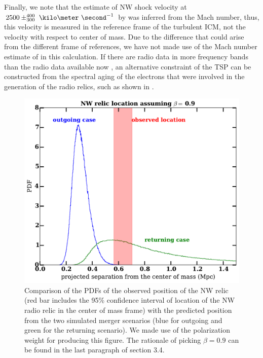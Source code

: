 \documentclass[letterpaper,useAMS,usenatbib]{mn2e}
\begin{document}
\par 
Finally, we note that the estimate of NW shock velocity at $2500
\pm^{400}_{300}~\kilo\meter~\second^{-1}$ by \cite{L13} was inferred from
the Mach number, thus, this velocity is measured in the reference frame of
the turbulent ICM, not the velocity with respect to center of
mass. Due to the difference that could arise from the different frame of
references, we have not made use of the Mach number estimate of \cite{L13} in this
calculation. If there are radio data in more frequency bands than
the radio data available now \citep{L13}, an alternative constraint of the
TSP can be constructed from the spectral aging of the electrons that were involved in the generation of the
radio relics, such as shown in \citet{Stroe14}. \par
\begin{figure}
	\includegraphics[width=\linewidth]{our_guess.pdf}
	\caption{Comparison of the PDFs of the observed position of the NW relic (red bar
		includes the 95\% confidence interval of location of the NW radio relic in the center of mass frame) with the predicted position from the two simulated merger
		scenarios (blue for outgoing and green for the returning scenario).
	We made use of the polarization weight for producing this figure.
	The
rationale of picking $\beta = 0.9$ can be found in the last paragraph of
section 3.4.} 
	\label{fig:our_guessed_scenario}
\end{figure}
\end{document}
